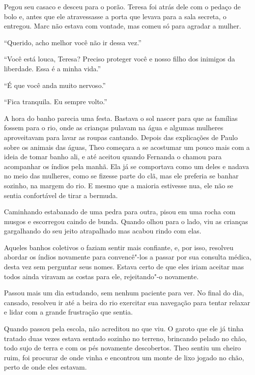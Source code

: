 Pegou seu casaco e desceu para o porão. Teresa foi atrás dele com o
pedaço de bolo e, antes que ele atravessasse a porta que levava para a
sala secreta, o entregou. Marc não estava com vontade, mas comeu só para
agradar a mulher.

``Querido, acho melhor você não ir dessa vez.''

``Você está louca, Teresa? Preciso proteger você e nosso filho dos
inimigos da liberdade. Essa é a minha vida.''

``É que você anda muito nervoso.''

``Fica tranquila. Eu sempre volto.''

\asterisc


A hora do banho parecia uma festa. Bastava o sol nascer para que as
famílias fossem para o rio, onde as crianças pulavam na água e algumas
mulheres aproveitavam para lavar as roupas cantando. Depois das
explicações de Paulo sobre os animais das águas, Theo começara a se
acostumar um pouco mais com a ideia de tomar banho ali, e até aceitou
quando Fernanda o chamou para acompanhar os índios pela manhã. Ela já se
comportava como um deles e nadava no meio das mulheres, como se fizesse
parte do clã, mas ele preferia se banhar sozinho, na margem do rio. E
mesmo que a maioria estivesse nua, ele não se sentia confortável de tirar
a bermuda.

Caminhando estabanado de uma pedra para outra, pisou em uma rocha com
musgos e escorregou caindo de bunda. Quando olhou para o lado, viu as
crianças gargalhando do seu jeito atrapalhado mas acabou rindo com elas.

Aqueles banhos coletivos o faziam sentir mais confiante, e, por isso,
resolveu abordar os índios novamente para convencê"-los a passar por sua
consulta médica, desta vez sem perguntar seus nomes. Estava certo de que
eles iriam aceitar mas todos ainda viravam as costas para ele,
rejeitando"-o novamente.

Passou mais um dia estudando, sem nenhum paciente para ver. No final do
dia, cansado, resolveu ir até a beira do rio exercitar sua navegação
para tentar relaxar e lidar com a grande frustração que sentia.

Quando passou pela escola, não acreditou no que viu. O garoto que ele já
tinha tratado duas vezes estava sentado sozinho no terreno, brincando
pelado no chão, todo sujo de terra e com os pés novamente descobertos.
Theo sentiu um cheiro ruim, foi procurar de onde vinha e encontrou um
monte de lixo jogado no chão, perto de onde eles estavam.

